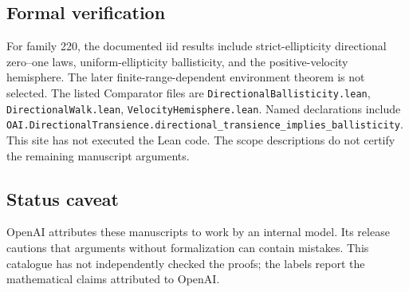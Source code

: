 \documentclass[11pt]{article}
\begin{document}
\subsection{Formal verification}
For family 220, the documented iid results include strict-ellipticity directional zero--one laws, uniform-ellipticity ballisticity, and the positive-velocity hemisphere. The later finite-range-dependent environment theorem is not selected. The listed Comparator files are \texttt{DirectionalBallisticity.lean}, \texttt{DirectionalWalk.lean}, \texttt{VelocityHemisphere.lean}. Named declarations include \texttt{OAI.DirectionalTransience.directional\_transience\_implies\_ballisticity}. This site has not executed the Lean code. The scope descriptions do not certify the remaining manuscript arguments.

\subsection{Status caveat}
OpenAI attributes these manuscripts to work by an internal model. Its release cautions that arguments without formalization can contain mistakes. This catalogue has not independently checked the proofs; the labels report the mathematical claims attributed to OpenAI.
\end{document}
